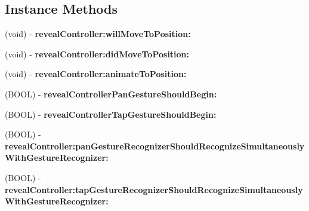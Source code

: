 \subsection*{Instance Methods}
\begin{DoxyCompactItemize}
\item 
\mbox{\label{protocol_s_w_reveal_view_controller_delegate-p_a59a840d7a53b9a634171a6aec9fc9f15}} 
(void) -\/ {\bfseries reveal\+Controller\+:will\+Move\+To\+Position\+:}
\item 
\mbox{\label{protocol_s_w_reveal_view_controller_delegate-p_a761b4572a649e3bd597d3924270e252b}} 
(void) -\/ {\bfseries reveal\+Controller\+:did\+Move\+To\+Position\+:}
\item 
\mbox{\label{protocol_s_w_reveal_view_controller_delegate-p_a4390f413e32f45f9d93961a3bd0b7f62}} 
(void) -\/ {\bfseries reveal\+Controller\+:animate\+To\+Position\+:}
\item 
\mbox{\label{protocol_s_w_reveal_view_controller_delegate-p_ab7aa296497102cbf527da72fdc4ef241}} 
(B\+O\+OL) -\/ {\bfseries reveal\+Controller\+Pan\+Gesture\+Should\+Begin\+:}
\item 
\mbox{\label{protocol_s_w_reveal_view_controller_delegate-p_a8974b4c32cfbe829803e2b7a7b6db3b6}} 
(B\+O\+OL) -\/ {\bfseries reveal\+Controller\+Tap\+Gesture\+Should\+Begin\+:}
\item 
\mbox{\label{protocol_s_w_reveal_view_controller_delegate-p_ae7d475a8e0718be35b7041861ba684ac}} 
(B\+O\+OL) -\/ {\bfseries reveal\+Controller\+:pan\+Gesture\+Recognizer\+Should\+Recognize\+Simultaneously\+With\+Gesture\+Recognizer\+:}
\item 
\mbox{\label{protocol_s_w_reveal_view_controller_delegate-p_a8451bac4b3256d3989073fabc8a4edd5}} 
(B\+O\+OL) -\/ {\bfseries reveal\+Controller\+:tap\+Gesture\+Recognizer\+Should\+Recognize\+Simultaneously\+With\+Gesture\+Recognizer\+:}
\item 

\end{DoxyCompactItemize}
